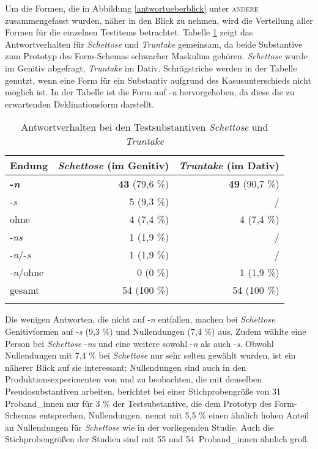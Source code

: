 Um die Formen, die in Abbildung \ref{antwortueberblick} unter \textsc{andere} zusammengefasst wurden, näher in den Blick zu nehmen, wird die Verteilung aller Formen für die einzelnen Test\-items betrachtet. Tabelle \ref{schettose} zeigt das Antwortverhalten für \textit{Schettose} und \textit{Truntake} gemeinsam, da beide Substantive zum Prototyp des Form-Schemas schwacher Maskulina gehören. \textit{Schettose} wurde im Genitiv abgefragt, \textit{Truntake} im Dativ. Schrägstriche werden in der Tabelle genutzt, wenn eine Form für ein Substantiv aufgrund des Kasusunterschieds nicht möglich ist. In der Tabelle ist die Form auf -\textit{n} hervorgehoben, da diese die zu erwartenden Deklinationsform darstellt. 

\begin{table}
\begin{tabular}{lrr}
\lsptoprule
Endung & \textit{Schettose} (im Genitiv) & \textit{Truntake} (im Dativ) \\\midrule
\textbf{-\textit{n}} &   \textbf{43} (79,6 \%) & \textbf{49} (90,7 \%) \\
-\textit{s} &    5 (9,3 \%) & / \\ 
 ohne &  4 (7,4 \%) & 4 (7,4 \%)\\ 
  -\textit{ns} & 1 (1,9 \%) & / \\
-\textit{n}/-\textit{s} &    1 (1,9 \%) & /\\ 
-\textit{n}/ohne & 0 (0 \%) & 1 (1,9 \%)\\
\midrule
gesamt & 54 (100 \%) & 54 (100 \%) \\
\lspbottomrule
\end{tabular}
\caption{Antwortverhalten bei den Testsubstantiven \textit{Schettose} und \textit{Truntake}}
\label{schettose}
\end{table}

Die wenigen Antworten, die nicht auf -\textit{n} entfallen, machen bei \textit{Schettose} Genitivformen auf -\textit{s} (9,3 \%)  und Nullendungen (7,4 \%) aus. Zudem wählte eine Person bei \textit{Schettose} -\textit{ns} und eine weitere sowohl -\textit{n} als auch -\textit{s}. Obwohl Nullendungen mit 7,4 \% bei \textit{Schettose} nur sehr selten gewählt wurden, ist ein näherer Blick auf sie interessant: Nullendungen sind auch in den Produktionsexperimenten von \textcite{Kopcke.2000b} und \textcite{Schmitt.2019} zu beobachten, die mit denselben Pseudosubstantiven arbeiten. \textcite[161]{Kopcke.2000b} berichtet bei einer Stichprobengröße von 31 Proband\_innen nur für 3 \% der Testsubstantive, die dem Prototyp des Form-Schemas entsprechen, Nullendungen. \textcite[167]{Schmitt.2019} nennt mit 5,5 \% einen ähnlich hohen Anteil an Nullendungen für \textit{Schettose} wie in der vorliegenden Studie. Auch die Stichprobengrößen der Studien sind mit 55 und 54~Proband\_innen ähnlich groß.

